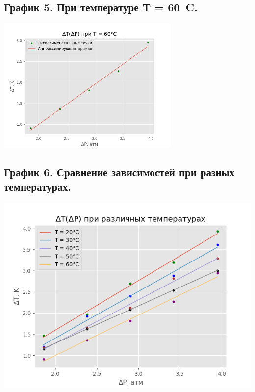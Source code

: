 \documentclass[15pt,a5paper,reqno]{article}
\begin{document}
    \subsection{График 5. При температуре T = 60\ \degree C.}
    \begin{center}
        \includegraphics[width=9cm]{60.png}
    \end{center}
    
    \subsection{График 6. Сравнение зависимостей при разных температурах.}
    \begin{center}
        \includegraphics[width=\textwidth]{All.png}
    \end{center}
    
\end{document}
